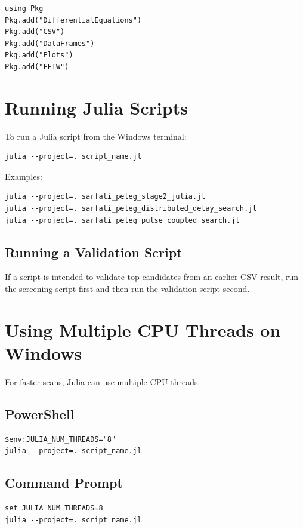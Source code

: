 \documentclass[11pt,a4paper]{article}
\begin{document}
\begin{lstlisting}[style=wincli]
using Pkg
Pkg.add("DifferentialEquations")
Pkg.add("CSV")
Pkg.add("DataFrames")
Pkg.add("Plots")
Pkg.add("FFTW")
\end{lstlisting}

\section{Running Julia Scripts}
To run a Julia script from the Windows terminal:

\begin{lstlisting}[style=wincli]
julia --project=. script_name.jl
\end{lstlisting}

Examples:

\begin{lstlisting}[style=wincli]
julia --project=. sarfati_peleg_stage2_julia.jl
julia --project=. sarfati_peleg_distributed_delay_search.jl
julia --project=. sarfati_peleg_pulse_coupled_search.jl
\end{lstlisting}

\subsection{Running a Validation Script}
If a script is intended to validate top candidates from an earlier CSV result,
run the screening script first and then run the validation script second.

\section{Using Multiple CPU Threads on Windows}
For faster scans, Julia can use multiple CPU threads.

\subsection{PowerShell}
\begin{lstlisting}[style=wincli]
$env:JULIA_NUM_THREADS="8"
julia --project=. script_name.jl
\end{lstlisting}

\subsection{Command Prompt}
\begin{lstlisting}[style=wincli]
set JULIA_NUM_THREADS=8
julia --project=. script_name.jl
\end{lstlisting}
\end{document}
